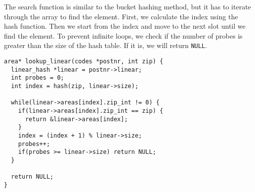 \documentclass[a4paper,11pt]{article}
\begin{document}
The search function is similar to the bucket hashing method, but it has to iterate through the array to find the element.
First, we calculate the index using the hash function. Then we start from the index and move to the next slot until we find the element.
To prevent infinite loops, we check if the number of probes is greater than the size of the hash table.
If it is, we will return {\tt NULL}.

\begin{verbatim}
area* lookup_linear(codes *postnr, int zip) {
  linear_hash *linear = postnr->linear;
  int probes = 0;
  int index = hash(zip, linear->size);
  
  while(linear->areas[index].zip_int != 0) {
    if(linear->areas[index].zip_int == zip) {
      return &linear->areas[index];
    }
    index = (index + 1) % linear->size;
    probes++;
    if(probes >= linear->size) return NULL;
  }
  
  return NULL;
}
\end{verbatim}
\end{document}
